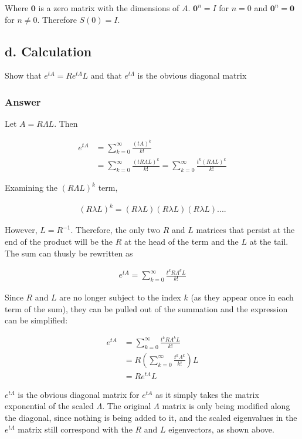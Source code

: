 \documentclass{article}
\begin{document}
		Where $\mathbf{0}$ is a zero matrix with the dimensions of $A$.  $\mathbf{0}^n=I$ for $n=0$ and $\mathbf{0}^n=\mathbf{0}$ for $n\neq0$.  Therefore $S(0)=I$.
		
		
		\subsection{d. Calculation}
		Show that $e^{tA}=Re^{t\Lambda}L$ and that $e^{t\Lambda}$ is the obvious diagonal matrix
		\subsubsection{Answer}
		
		Let $A=R\Lambda L$.  Then
		
		\begin{align*}
			e^{tA}&=\sum_{k=0}^{\infty}\frac{(tA)^k}{k!}\\
			&=\sum_{k=0}^{\infty}\frac{(tR\Lambda L)^k}{k!}=\sum_{k=0}^{\infty}\frac{t^k(R\Lambda L)^k}{k!}
		\end{align*}
		
		Examining the $(R\Lambda L)^k$ term,
		
		\begin{align*}
			(R\lambda L)^{k}=(R\lambda L)(R\lambda L)(R\lambda L)....
		\end{align*}
		
		However, $L=R^{-1}$.  Therefore, the only two $R$ and $L$ matrices that persist at the end of the product will be the $R$ at the head of the term and the $L$ at the tail.  The sum can thusly be rewritten as
		
		\begin{align*}
			e^{tA}=\sum_{k=0}^{\infty}\frac{t^{k}R\Lambda^{k}L}{k!}
		\end{align*}
		
		Since $R$ and $L$ are no longer subject to the index $k$ (as they appear once in each term of the sum), they can be pulled out of the summation and the expression can be simplified:
		
		\begin{align*}
			e^{tA}&=\sum_{k=0}^{\infty}\frac{t^{k}R\Lambda^{k}L}{k!}\\
			&=R(\sum_{k=0}^{\infty}\frac{t^{k}\Lambda^{k}}{k!})L\\
			&=Re^{t\Lambda}L
		\end{align*}
		
		$e^{t\Lambda}$ is the obvious diagonal matrix for $e^{tA}$ as it simply takes the matrix exponential of the scaled $\Lambda$.  The original $\Lambda$ matrix is only being modified along the diagonal, since nothing is being added to it, and the scaled eigenvalues in the $e^{t\Lambda}$ matrix still correspond with the $R$ and $L$ eigenvectors, as shown above.
		
\end{document}
